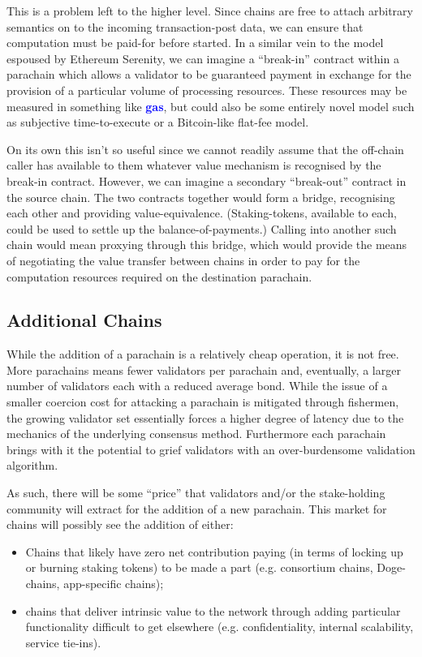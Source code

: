\documentclass[t,usepdftitle=false]{beamer}
\makeatletter
\newcommand*\eg{e.g.\@\xspace}
\renewcommand{\textit}[1]{\textcolor{blue}{\textbf{#1}}}
\makeatother
\begin{document}
\begin{frame}
This is a problem left to the higher level. Since chains are free to attach arbitrary semantics on to the incoming transaction-post data, we can ensure that computation must be paid-for before started. In a similar vein to the model espoused by Ethereum Serenity, we can imagine a ``break-in'' contract within a parachain which allows a validator to be guaranteed payment in exchange for the provision of a particular volume of processing resources. These resources may be measured in something like \textit{gas}, but could also be some entirely novel model such as subjective time-to-execute or a Bitcoin-like flat-fee model.

 On its own this isn't so useful since we cannot readily assume that the off-chain caller has available to them whatever value mechanism is recognised by the break-in contract. However, we can imagine a secondary ``break-out'' contract in the source chain. The two contracts together would form a bridge, recognising each other and providing value-equivalence. (Staking-tokens, available to each, could be used to settle up the balance-of-payments.) Calling into another such chain would mean proxying through this bridge, which would provide the means of negotiating the value transfer between chains in order to pay for the computation resources required on the destination parachain.

\subsection{Additional Chains}
\label{additional-chains}

 While the addition of a parachain is a relatively cheap operation, it is not free. More parachains means fewer validators per parachain and, eventually, a larger number of validators each with a reduced average bond. While the issue of a smaller coercion cost for attacking a parachain is mitigated through fishermen, the growing validator set essentially forces a higher degree of latency due to the mechanics of the underlying consensus method. Furthermore each parachain brings with it the potential to grief validators with an over-burdensome validation algorithm.

 As such, there will be some ``price'' that validators and/or the stake-holding community will extract for the addition of a new parachain. This market for chains will possibly see the addition of either:

\begin{itemize}
\item Chains that likely have zero net contribution paying (in terms of locking up or burning staking tokens) to be made a part (\eg consortium chains, Doge-chains, app-specific chains);
\item chains that deliver intrinsic value to the network through adding particular functionality difficult to get elsewhere (\eg confidentiality, internal scalability, service tie-ins).
\end{itemize}


\end{frame}
\end{document}
